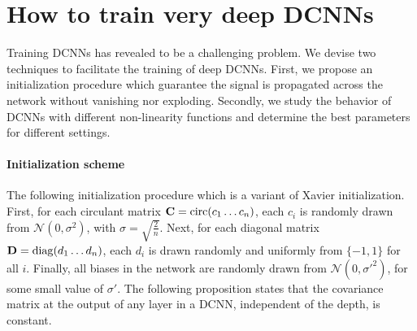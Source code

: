\section{How to train very deep DCNNs}
\label{section:training}


Training DCNNs has revealed to be a challenging problem.
We devise two techniques to facilitate the training of deep DCNNs.
First, we propose an initialization procedure which guarantee the signal is propagated across the network without vanishing nor exploding.
Secondly, we study the behavior of DCNNs with different non-linearity functions and determine the best parameters for different settings. 

\paragraph{Initialization scheme}
The following initialization procedure which is a variant of Xavier initialization.
First, for each circulant matrix $\mathbf{C} = \mathrm{circ} (c_{1} \ldots c_{n})$, each $c_{i}$ is randomly drawn from $\mathcal{N} \left(0,\sigma^{2}\right)$, with $\sigma=\sqrt{\frac{2}{n}}$.
Next, for each diagonal matrix $\mathbf{D} = \mathrm{diag} (d_{1} \ldots d_{n})$, each $d_{i}$ is drawn randomly and uniformly from $\{-1,1\}$ for all $i$.
Finally, all biases in the network are randomly drawn from $\mathcal{N}\left(0,\sigma'^{2}\right)$, for some small value of $\sigma'$.
The following proposition states that the covariance matrix at the output of any layer in a DCNN, independent of the depth, is constant.

